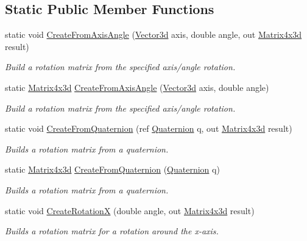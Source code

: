 \subsection*{Static Public Member Functions}
\begin{DoxyCompactItemize}
\item 
static void \hyperlink{struct_open_t_k_1_1_matrix4x3d_a6c60adc306f16ef2b3a16e0ac4efdee9}{Create\-From\-Axis\-Angle} (\hyperlink{struct_open_t_k_1_1_vector3d}{Vector3d} axis, double angle, out \hyperlink{struct_open_t_k_1_1_matrix4x3d}{Matrix4x3d} result)
\begin{DoxyCompactList}\small\item\em Build a rotation matrix from the specified axis/angle rotation. \end{DoxyCompactList}\item 
static \hyperlink{struct_open_t_k_1_1_matrix4x3d}{Matrix4x3d} \hyperlink{struct_open_t_k_1_1_matrix4x3d_a9f69f01d752d0e264d9c53fb4fb42ace}{Create\-From\-Axis\-Angle} (\hyperlink{struct_open_t_k_1_1_vector3d}{Vector3d} axis, double angle)
\begin{DoxyCompactList}\small\item\em Build a rotation matrix from the specified axis/angle rotation. \end{DoxyCompactList}\item 
static void \hyperlink{struct_open_t_k_1_1_matrix4x3d_a8a92f6b4397412816316027a7cc94a18}{Create\-From\-Quaternion} (ref \hyperlink{struct_open_t_k_1_1_quaternion}{Quaternion} q, out \hyperlink{struct_open_t_k_1_1_matrix4x3d}{Matrix4x3d} result)
\begin{DoxyCompactList}\small\item\em Builds a rotation matrix from a quaternion. \end{DoxyCompactList}\item 
static \hyperlink{struct_open_t_k_1_1_matrix4x3d}{Matrix4x3d} \hyperlink{struct_open_t_k_1_1_matrix4x3d_aaed45705b9a629e1dd306e7efa9e96b6}{Create\-From\-Quaternion} (\hyperlink{struct_open_t_k_1_1_quaternion}{Quaternion} q)
\begin{DoxyCompactList}\small\item\em Builds a rotation matrix from a quaternion. \end{DoxyCompactList}\item 
static void \hyperlink{struct_open_t_k_1_1_matrix4x3d_aa9e71b8bd33f3f04a779424450577378}{Create\-Rotation\-X} (double angle, out \hyperlink{struct_open_t_k_1_1_matrix4x3d}{Matrix4x3d} result)
\begin{DoxyCompactList}\small\item\em Builds a rotation matrix for a rotation around the x-\/axis. \end{DoxyCompactList}\item 

\end{DoxyCompactItemize}
